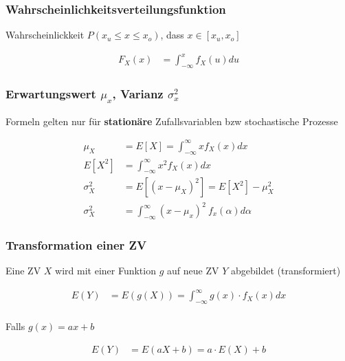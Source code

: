 \documentclass[10pt,a4paper]{article}
\begin{document}
    \subsubsection{Wahrscheinlichkeitsverteilungsfunktion}
    Wahrscheinlickkeit $P(x_u \leq x \leq x_o )$, dass $x \in [x_u,x_o]$ 
      \begin{mdframed}[style=exercise]
        \begin{align}
            F_X(x) &= \displaystyle\int_{-\infty}^{x} f_X(u)du
        \end{align}
      \end{mdframed}

    \subsubsection{Erwartungswert $\mu_x$, Varianz $\sigma_x^2$}
    Formeln gelten nur für \textbf{stationäre} Zufallsvariablen bzw stochastische Prozesse
      \begin{mdframed}[style=exercise]
        \begin{align}
            \mu_X &= E[X] = \displaystyle\int_{-\infty}^{\infty} x f_X(x) dx \\
             E[X^2] &= \displaystyle\int_{-\infty}^{\infty} x^2 f_X(x) dx \\
            \sigma_X^2 &= E[(x-\mu_X)^2] = E[X^2]-\mu_X^2 \\
            \sigma_X^2 &= \displaystyle\int_{-\infty}^{\infty} (x-\mu_x)^2 \ f_x(\alpha) d\alpha
        \end{align}
      \end{mdframed}

      \subsubsection{Transformation einer ZV}
      Eine ZV $X$ wird mit einer Funktion $g$ auf neue ZV $Y$ abgebildet (transformiert)
      \begin{mdframed}[style=exercise]
        \begin{align}
            E(Y) &= E(g(X)) =\displaystyle\int_{-\infty}^{\infty} g(x) \cdot f_X(x) dx \\
        \end{align}
      \end{mdframed}
      Falls $g(x) = ax+b$
      \begin{mdframed}[style=exercise]
        \begin{align}
            E(Y) &= E(aX+b) = a \cdot E(X) + b \\
        \end{align}
      \end{mdframed}
\end{document}
